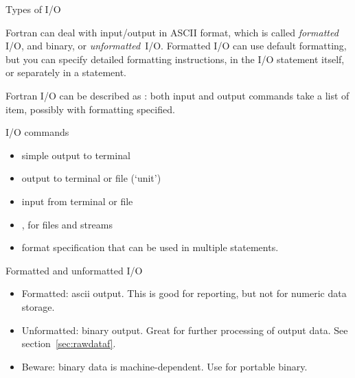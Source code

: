 
 {Types of I/O}

Fortran can deal with input/output in ASCII format, which is called
\emph{formatted} I/O, and binary, or
\emph{unformatted}~I/O.  Formatted I/O can use
default formatting, but you can specify detailed formatting
instructions, in the I/O statement itself, or separately in a
 statement.

Fortran I/O can be described as :
both input and output commands take a list of item, possibly with
formatting specified.

\begin{block}{I/O commands}
  \label{sl:fio-commands}
  \begin{itemize}
  \item {} simple output to terminal
  \item {} output to terminal or file (`unit')
  \item {} input from terminal or file
  \item {},  for files and
    streams
  \item {} format specification that can be used
    in multiple statements.
  \end{itemize}
\end{block}

\begin{block}{Formatted and unformatted I/O}
  \label{sl:fio-types}
  \begin{itemize}
  \item Formatted: ascii output. This is good for reporting, but not
    for numeric data storage.
  \item Unformatted: binary output. Great for further processing of
    output data. See section~\ref{sec:rawdataf}.
  \item Beware: binary data is machine-dependent. Use 
    for portable binary.
  \end{itemize}
\end{block}

